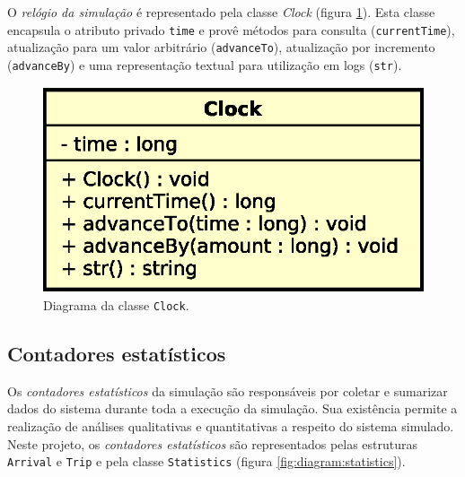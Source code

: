 O \textit{relógio da simulação} é representado pela classe \textit{Clock}
(figura \ref{fig:diagram:clock}). Esta classe encapsula o atributo privado
\texttt{time} e provê métodos para consulta (\texttt{currentTime}), atualização
para um valor arbitrário (\texttt{advanceTo}), atualização por incremento
(\texttt{advanceBy}) e uma representação textual para utilização em logs
(\texttt{str}).

\begin{figure}[htb!]
  \centering
  \includegraphics[scale=0.6]{img/Clock}
  \caption{Diagrama da classe \texttt{Clock}.}
\label{fig:diagram:clock}
\end{figure}

\subsection{Contadores estatísticos}

Os \textit{contadores estatísticos} da simulação são responsáveis por coletar e
sumarizar dados do sistema durante toda a execução da simulação. Sua existência
permite a realização de análises qualitativas e quantitativas a respeito do
sistema simulado. Neste projeto, os \textit{contadores estatísticos} são
representados pelas estruturas \texttt{Arrival} e \texttt{Trip} e pela classe
\texttt{Statistics} (figura \ref{fig:diagram:statistics}).


